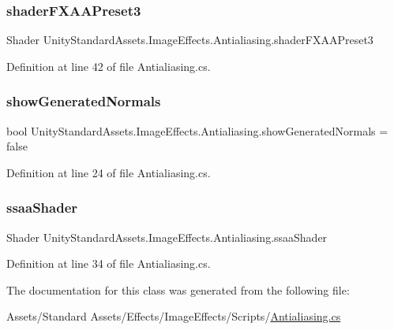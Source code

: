 \subsubsection{\texorpdfstring{shader\+F\+X\+A\+A\+Preset3}{shaderFXAAPreset3}}
{\footnotesize\ttfamily Shader Unity\+Standard\+Assets.\+Image\+Effects.\+Antialiasing.\+shader\+F\+X\+A\+A\+Preset3}



Definition at line 42 of file Antialiasing.\+cs.

\mbox{\label{class_unity_standard_assets_1_1_image_effects_1_1_antialiasing_ae0cfc0cdaa93373426148c7ea1e8fd76}} 
\subsubsection{\texorpdfstring{show\+Generated\+Normals}{showGeneratedNormals}}
{\footnotesize\ttfamily bool Unity\+Standard\+Assets.\+Image\+Effects.\+Antialiasing.\+show\+Generated\+Normals = false}



Definition at line 24 of file Antialiasing.\+cs.

\mbox{\label{class_unity_standard_assets_1_1_image_effects_1_1_antialiasing_ac0b8e97f36d170cd2555aac23943b506}} 
\subsubsection{\texorpdfstring{ssaa\+Shader}{ssaaShader}}
{\footnotesize\ttfamily Shader Unity\+Standard\+Assets.\+Image\+Effects.\+Antialiasing.\+ssaa\+Shader}



Definition at line 34 of file Antialiasing.\+cs.



The documentation for this class was generated from the following file\+:\begin{DoxyCompactItemize}
\item 
Assets/\+Standard Assets/\+Effects/\+Image\+Effects/\+Scripts/\mbox{\hyperlink{_antialiasing_8cs}{Antialiasing.\+cs}}\end{DoxyCompactItemize}
